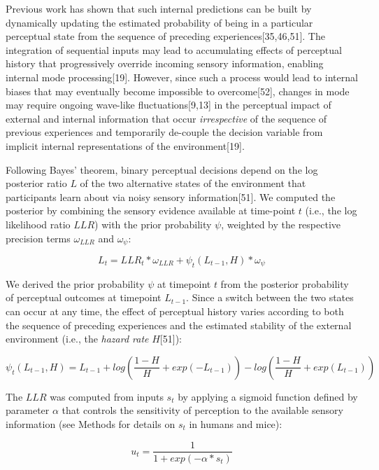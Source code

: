 \documentclass[
]{article}
\begin{document}
Previous work has shown that such internal predictions can be built by
dynamically updating the estimated probability of being in a particular
perceptual state from the sequence of preceding
experiences{[}35,46,51{]}. The integration of sequential inputs may lead
to accumulating effects of perceptual history that progressively
override incoming sensory information, enabling internal mode
processing{[}19{]}. However, since such a process would lead to internal
biases that may eventually become impossible to overcome{[}52{]},
changes in mode may require ongoing wave-like fluctuations{[}9,13{]} in
the perceptual impact of external and internal information that occur
\emph{irrespective} of the sequence of previous experiences and
temporarily de-couple the decision variable from implicit internal
representations of the environment{[}19{]}.

Following Bayes' theorem, binary perceptual decisions depend on the log
posterior ratio \(L\) of the two alternative states of the environment
that participants learn about via noisy sensory information{[}51{]}. We
computed the posterior by combining the sensory evidence available at
time-point \(t\) (i.e., the log likelihood ratio \(LLR\)) with the prior
probability \(\psi\), weighted by the respective precision terms
\(\omega_{LLR}\) and \(\omega_{\psi}\):

\begin{equation}
L_t = LLR_t * \omega_{LLR} + \psi_t(L_{t-1}, H) * \omega_{\psi}
\end{equation}

We derived the prior probability \(\psi\) at timepoint \(t\) from the
posterior probability of perceptual outcomes at timepoint \(L_{t-1}\).
Since a switch between the two states can occur at any time, the effect
of perceptual history varies according to both the sequence of preceding
experiences and the estimated stability of the external environment
(i.e., the \emph{hazard rate} \(H\){[}51{]}):

\begin{equation}
\psi_t(L_{t-1}, H)  = L_{t-1} + log(\frac{1-H}{H} + exp(-L_{t-1})) - log(\frac{1-H}{H} + exp(L_{t-1}))
\end{equation}

The \(LLR\) was computed from inputs \(s_t\) by applying a sigmoid
function defined by parameter \(\alpha\) that controls the sensitivity
of perception to the available sensory information (see Methods for
details on \(s_t\) in humans and mice):

\begin{equation}
u_t = \frac{1}{1 + exp(-\alpha * s_t)}
\end{equation}
\end{document}
